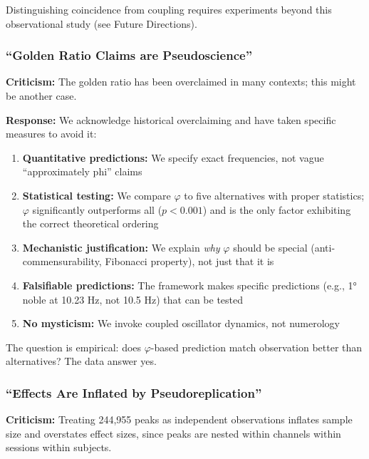 \documentclass[11pt,a4paper]{article}
\newcommand{\phisym}{\varphi}
\begin{document}
Distinguishing coincidence from coupling requires experiments beyond this observational study (see Future Directions).

\subsubsection{``Golden Ratio Claims are Pseudoscience''}

\textbf{Criticism:} The golden ratio has been overclaimed in many contexts; this might be another case.

\textbf{Response:} We acknowledge historical overclaiming and have taken specific measures to avoid it:

\begin{enumerate}
    \item \textbf{Quantitative predictions:} We specify exact frequencies, not vague ``approximately phi'' claims
    
    \item \textbf{Statistical testing:} We compare $\phisym$ to five alternatives with proper statistics; $\phisym$ significantly outperforms all ($p < 0.001$) and is the only factor exhibiting the correct theoretical ordering
    
    \item \textbf{Mechanistic justification:} We explain \textit{why} $\phisym$ should be special (anti-commensurability, Fibonacci property), not just that it is
    
    \item \textbf{Falsifiable predictions:} The framework makes specific predictions (e.g., 1° noble at 10.23 Hz, not 10.5 Hz) that can be tested
    
    \item \textbf{No mysticism:} We invoke coupled oscillator dynamics, not numerology
\end{enumerate}

The question is empirical: does $\phisym$-based prediction match observation better than alternatives? The data answer yes.

\subsubsection{``Effects Are Inflated by Pseudoreplication''}

\textbf{Criticism:} Treating 244,955 peaks as independent observations inflates sample size and overstates effect sizes, since peaks are nested within channels within sessions within subjects.
\end{document}
